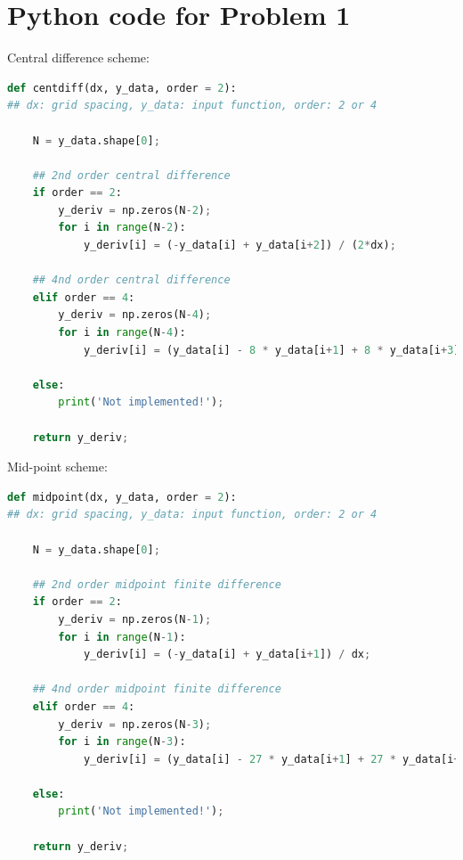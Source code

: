 \documentclass{article}
\begin{document}
\section{Python code for Problem 1}
Central difference scheme:
\begin{lstlisting}[language = Python]
def centdiff(dx, y_data, order = 2):
## dx: grid spacing, y_data: input function, order: 2 or 4

    N = y_data.shape[0];
    
    ## 2nd order central difference
    if order == 2:
        y_deriv = np.zeros(N-2);
        for i in range(N-2):
            y_deriv[i] = (-y_data[i] + y_data[i+2]) / (2*dx);
            
    ## 4nd order central difference
    elif order == 4:
        y_deriv = np.zeros(N-4);
        for i in range(N-4):
            y_deriv[i] = (y_data[i] - 8 * y_data[i+1] + 8 * y_data[i+3] - y_data[i+4]) / (12 * dx);
            
    else:
        print('Not implemented!');
        
    return y_deriv;
\end{lstlisting}
Mid-point scheme:
\begin{lstlisting}[language = Python]
def midpoint(dx, y_data, order = 2):
## dx: grid spacing, y_data: input function, order: 2 or 4

    N = y_data.shape[0];
    
    ## 2nd order midpoint finite difference
    if order == 2:
        y_deriv = np.zeros(N-1);
        for i in range(N-1):
            y_deriv[i] = (-y_data[i] + y_data[i+1]) / dx;
            
    ## 4nd order midpoint finite difference
    elif order == 4:
        y_deriv = np.zeros(N-3);
        for i in range(N-3):
            y_deriv[i] = (y_data[i] - 27 * y_data[i+1] + 27 * y_data[i+2] - y_data[i+3]) / (24 * dx);
            
    else:
        print('Not implemented!');
        
    return y_deriv;
\end{lstlisting}
\end{document}
